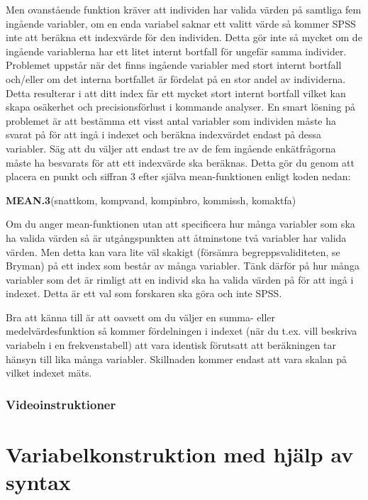 \documentclass[
]{book}
\newenvironment{Shaded}{\begin{snugshade}}{\end{snugshade}}
\newcommand{\FunctionTok}[1]{\textcolor[rgb]{0.13,0.29,0.53}{\textbf{#1}}}
\newcommand{\NormalTok}[1]{#1}
\begin{document}
Men ovanstående funktion kräver att individen har valida värden på samtliga fem ingående variabler,
om en enda variabel saknar ett valitt värde så kommer SPSS inte att beräkna ett indexvärde för den
individen. Detta gör inte så mycket om de ingående variablerna har ett litet internt bortfall för ungefär
samma individer. Problemet uppstår när det finns ingående variabler med stort internt bortfall och/eller
om det interna bortfallet är fördelat på en stor andel av individerna. Detta resulterar i att ditt index får
ett mycket stort internt bortfall vilket kan skapa osäkerhet och precisionsförlust i kommande analyser.
En smart lösning på problemet är att bestämma ett visst antal variabler som individen måste ha svarat
på för att ingå i indexet och beräkna indexvärdet endast på dessa variabler. Säg att du väljer att endast
tre av de fem ingående enkätfrågorna måste ha besvarats för att ett indexvärde ska beräknas. Detta gör
du genom att placera en punkt och siffran 3 efter själva mean-funktionen enligt koden nedan:

\begin{Shaded}
\begin{Highlighting}[]
\FunctionTok{MEAN.3}\NormalTok{(snattkom, kompvand, kompinbro, kommissh, komaktfa)}
\end{Highlighting}
\end{Shaded}

Om du anger mean-funktionen utan att specificera hur många variabler som ska ha valida värden så är
utgångspunkten att åtminstone två variabler har valida värden. Men detta kan vara lite väl skakigt
(försämra begreppsvaliditeten, se Bryman) på ett index som består av många variabler. Tänk därför på
hur många variabler som det är rimligt att en individ ska ha valida värden på för att ingå i indexet. Detta
är ett val som forskaren ska göra och inte SPSS.

Bra att känna till är att oavsett om du väljer en summa- eller medelvärdesfunktion så kommer
fördelningen i indexet (när du t.ex. vill beskriva variabeln i en frekvenstabell) att vara identisk förutsatt att beräkningen tar hänsyn till lika många variabler. Skillnaden kommer endast att vara skalan på vilket indexet mäts.

\hypertarget{videoinstruktioner-1}{%
\subsection{Videoinstruktioner}\label{videoinstruktioner-1}}

\hypertarget{variabelkonstruktion-med-hjuxe4lp-av-syntax}{%
\chapter{Variabelkonstruktion med hjälp av syntax}\label{variabelkonstruktion-med-hjuxe4lp-av-syntax}}
\end{document}
